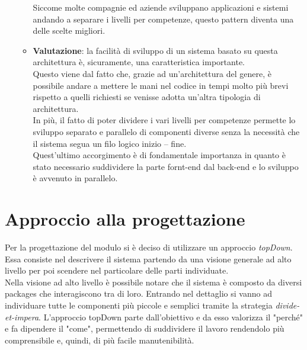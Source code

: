 \begin{itemize}
\begin{itemize}
		Siccome molte compagnie ed aziende sviluppano applicazioni e sistemi andando a separare i livelli per competenze, questo pattern diventa una delle scelte migliori\cite{3tierArch}\cite{3tierArch2}.
		\item \textbf{Valutazione}: la facilità di sviluppo di un sistema basato su questa architettura è, sicuramente, una caratteristica importante.\\
		Questo viene dal fatto che, grazie ad un'architettura del genere, è possibile andare a mettere le mani nel codice in tempi molto più brevi rispetto a quelli richiesti se venisse adotta un'altra tipologia di architettura.\\
		In più, il fatto di poter dividere i vari livelli per competenze permette lo sviluppo separato e parallelo di componenti diverse senza la necessità che il sistema segua un filo logico inizio – fine.\\
		Quest'ultimo accorgimento è di fondamentale importanza in quanto è stato necessario suddividere la parte fornt-end dal back-end e lo sviluppo è avvenuto in parallelo.
	\end{itemize}
\end{itemize}
\section{Approccio alla progettazione}
Per la progettazione del modulo si è deciso di utilizzare un approccio \emph{\gls{topDown}}\glsfirstoccur. Essa consiste nel descrivere il sistema partendo da una visione generale ad alto livello per poi scendere nel particolare delle parti individuate.\\
Nella visione ad alto livello è possibile notare che il sistema è composto da diversi packages che interagiscono tra di loro. Entrando nel dettaglio si vanno ad individuare tutte le componenti più piccole e semplici tramite la strategia \textit{divide-et-impera}. L'approccio \gls{topDown} parte dall’obiettivo e da esso valorizza il "perché" e fa dipendere il "come", permettendo di suddividere il lavoro rendendolo più comprensibile e, quindi, di più facile manutenibilità.
